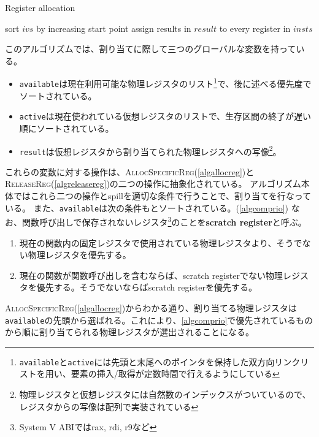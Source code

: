 \documentclass[uplatex,a4paper]{jsarticle}
\begin{document}
\begin{algorithm}[h]
\caption{Register allocation}\label{algalloc}
\begin{algorithmic}[1]
   \State sort $ivs$ by increasing start point
   \State {}
   \State assign results in $result$ to every register in $insts$
\EndProcedure
\end{algorithmic}
\end{algorithm}

このアルゴリズムでは、割り当てに際して三つのグローバルな変数を持っている。

\begin{itemize}
  \item \texttt{available}は現在利用可能な物理レジスタのリスト\footnote{\texttt{available}と\texttt{active}には先頭と末尾へのポインタを保持した双方向リンクリストを用い、要素の挿入/取得が定数時間で行えるようにしている}で、後に述べる優先度でソートされている。
  \item \texttt{active}は現在使われている仮想レジスタのリストで、生存区間の終了が遅い順にソートされている。
  \item \texttt{result}は仮想レジスタから割り当てられた物理レジスタへの写像\footnote{物理レジスタと仮想レジスタには自然数のインデックスがついているので、レジスタからの写像は配列で実装されている}。
\end{itemize}

これらの変数に対する操作は、\textsc{AllocSpecificReg}(\cref{algallocreg})と\textsc{ReleaseReg}(\cref{algreleasereg})の二つの操作に抽象化されている。
アルゴリズム本体ではこれら二つの操作とspillを適切な条件で行うことで、割り当てを行なっている。
また、\texttt{available}は次の条件もとソートされている。(\cref{algcomprio})
なお、関数呼び出しで保存されないレジスタ\footnote{System V ABIではrax, rdi, r9など}のことを\textbf{scratch register}と呼ぶ。

\begin{enumerate}
  \item 現在の関数内の固定レジスタで使用されている物理レジスタより、そうでない物理レジスタを優先する。
  \item 現在の関数が関数呼び出しを含むならば、scratch registerでない物理レジスタを優先する。そうでないならばscratch registerを優先する。
\end{enumerate}

\textsc{AllocSpecificReg}(\cref{algallocreg})からわかる通り、割り当てる物理レジスタは\texttt{available}の先頭から選ばれる。これにより、\cref{algcomprio}で優先されているものから順に割り当てられる物理レジスタが選出されることになる。
\end{document}
